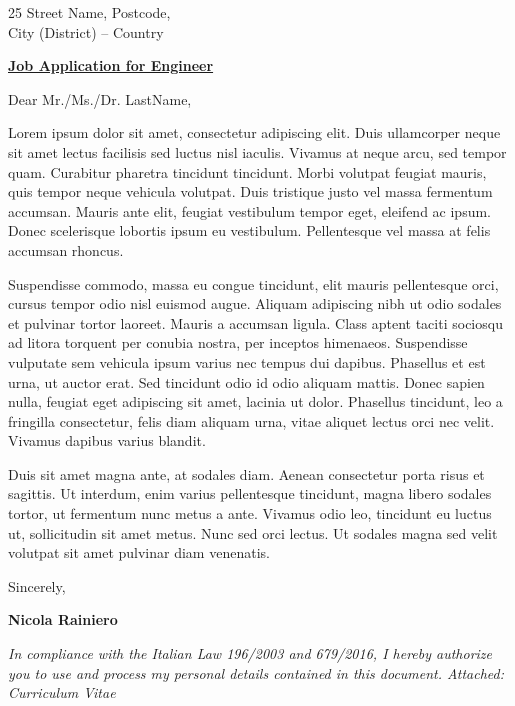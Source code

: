 \documentclass[9pt]{developercv} %
\begin{document}
\begin{coverletter}
\newcommand\titlefooter{Cover Letter} %
\Header
\vspace{1.0cm}
\begin{flushright}
25 Street Name, Postcode,\\
City (District) -- Country\\
\end{flushright}
\vspace{1.0cm}

\underline{\textbf{Job Application for Engineer}}

\vspace{0.5cm}

Dear Mr./Ms./Dr. LastName,

Lorem ipsum dolor sit amet, consectetur adipiscing elit. Duis ullamcorper neque sit amet lectus facilisis sed luctus nisl iaculis. Vivamus at neque arcu, sed tempor quam. Curabitur pharetra tincidunt tincidunt. Morbi volutpat feugiat mauris, quis tempor neque vehicula volutpat. Duis tristique justo vel massa fermentum accumsan. Mauris ante elit, feugiat vestibulum tempor eget, eleifend ac ipsum. Donec scelerisque lobortis ipsum eu vestibulum. Pellentesque vel massa at felis accumsan rhoncus.

Suspendisse commodo, massa eu congue tincidunt, elit mauris pellentesque orci, cursus tempor odio nisl euismod augue. Aliquam adipiscing nibh ut odio sodales et pulvinar tortor laoreet. Mauris a accumsan ligula. Class aptent taciti sociosqu ad litora torquent per conubia nostra, per inceptos himenaeos. Suspendisse vulputate sem vehicula ipsum varius nec tempus dui dapibus. Phasellus et est urna, ut auctor erat. Sed tincidunt odio id odio aliquam mattis. Donec sapien nulla, feugiat eget adipiscing sit amet, lacinia ut dolor. Phasellus tincidunt, leo a fringilla consectetur, felis diam aliquam urna, vitae aliquet lectus orci nec velit. Vivamus dapibus varius blandit.

Duis sit amet magna ante, at sodales diam. Aenean consectetur porta risus et sagittis. Ut interdum, enim varius pellentesque tincidunt, magna libero sodales tortor, ut fermentum nunc metus a ante. Vivamus odio leo, tincidunt eu luctus ut, sollicitudin sit amet metus. Nunc sed orci lectus. Ut sodales magna sed velit volutpat sit amet pulvinar diam venenatis.

\vspace{1.0cm}

Sincerely,

\textbf{Nicola Rainiero}

\vspace{2.5cm}

\emph{In compliance with the Italian Law 196/2003 and 679/2016, I hereby authorize you to use and process my personal details contained in this document. Attached: Curriculum Vitae}
\newpage
\end{coverletter}
\end{document}
